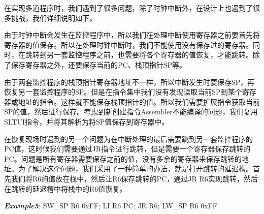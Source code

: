 在实现多道程序时，我们遇到了很多问题，除了时钟中断外，在设计上也遇到了很多挑战，我们详细说明如下。

由于时钟中断会发生在监控程序中，所以我们在处理中断使用寄存器之前要首先将寄存器的值保存。所以在处理时钟中断时，我们不能使用没有保存过的寄存器。同时，在跳转到另一套监控程序之前，也需要将各个寄存器的值恢复，才能跳转。除了保存寄存器之外，还要保存当前的PC、栈顶指针SP等。

由于两套监控程序的栈顶指针寄存器地址不一样，所以中断发生时要保存SP，再恢复另一套监控程序的SP。但是在指令集中我们没有发现读取当前SP到某个寄存器或地址的指令。这样就不能保存栈顶指针的值。所以我们需要扩展指令获取当前SP的值，然后进行保存。考虑到新创建指令Assembler不能编译的问题，我们复用SLTUI指令，并将其解析为将SP值保存到寄存器中。

在恢复现场时遇到的另一个问题为在中断处理的最后需要跳到另一套监控程序的PC值，这时候我们需要通过JR指令进行跳转，但是需要一个寄存器保存跳转的PC。问题是所有寄存器需要保存之前的值，没有多余的寄存器来保存跳转的地址。为了解决这个问题，我们采用了一种简单的办法，就是打开跳转的延迟槽。首先我们将R6的值放在栈中，然后让R6保存跳转的PC，通过JR R6实现跳转，然后在跳转的延迟槽中将栈中的R6值恢复。


\textbf{\textit{Example5}}: \quad SW\_SP R6 0xFF; \quad LI R6 PC; \quad JR R6; \quad LW\_SP R6 0xFF






